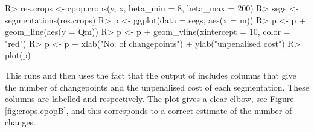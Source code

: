 \documentclass[nojss]{jss}
\begin{document}
\begin{CodeChunk}
\begin{CodeInput}
R> res.crops <- cpop.crops(y, x, beta_min = 8, beta_max = 200)
R> segs <- segmentations(res.crops)
R> p <- ggplot(data = segs, aes(x = m))
R> p <- p + geom_line(aes(y = Qm))
R> p <- p + geom_vline(xintercept = 10, color = "red")
R> p <- p + xlab("No. of changepoints") + ylab("unpenalised cost")
R> plot(p)
\end{CodeInput}
\end{CodeChunk}
This runs  and then uses the fact that the output of  includes columns that give the number of changepoints and the unpenalised cost of each segmentation. These columns are labelled  and  respectively.
The plot gives a clear elbow, see Figure \ref{fig:crops.cpopB}, and this corresponds to a correct estimate of the number of changes. %
%
%
\end{document}
